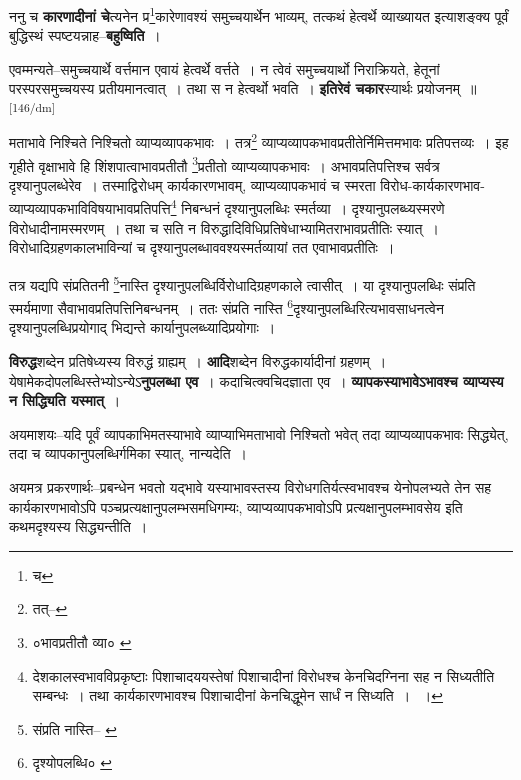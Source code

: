\documentclass[article,12pt,a4paper]{memoir}
\begin{document}
	  \pstart ननु च \textbf{कारणादीनां चे}त्यनेन प्र\footnote{च}कारेणावश्यं समुच्चयार्थेन भाव्यम्, तत्कथं हेत्वर्थे व्याख्यायत इत्याशङ्क्य पूर्वं बुद्धिस्थं स्पष्टयन्नाह--\textbf{बहुष्विति} ।
	\pend
      

	  \pstart एवम्मन्यते--समुच्चयार्थे वर्त्तमान एवायं हेत्वर्थे वर्त्तते । न त्वेवं समुच्चयार्थो निराक्रियते, हेतूनां परस्परसमुच्चयस्य प्रतीयमानत्वात् । तथा स न हेत्वर्थो भवति । \textbf{इतिरेवं चकार}स्यार्थः प्रयोजनम् ॥
	\pend
      \leavevmode\textsuperscript{\rmlatinfont\tiny [146/dm]}

	  \pstart मताभावे निश्चिते निश्चितो व्याप्यव्यापकभावः । तत्र\footnote{तत्--\cite{dp-msC}} व्याप्यव्यापकभावप्रतीतेर्निमित्तमभावः प्रतिपत्तव्यः । इह गृहीते वृक्षाभावे हि शिंशपात्वाभावप्रतीतौ \footnote{०भावप्रतीतौ व्या० \cite{dp-msB}}प्रतीतो व्याप्यव्यापकभावः । अभावप्रतिपत्तिश्च सर्वत्र दृश्यानुपलब्धेरेव । तस्माद्विरोधम् कार्यकारणभावम्, व्याप्यव्यापकभावं च स्मरता विरोध-कार्यकारणभाव-व्याप्यव्यापकभाविविषयाभावप्रतिपत्ति\footnote{देशकालस्वभावविप्रकृष्टाः पिशाचादययस्तेषां पिशाचादीनां विरोधश्च केनचिदग्निना सह न सिध्यतीति सम्बन्धः । तथा कार्यकारणभावश्च पिशाचादीनां केनचिद्धूमेन सार्धं न सिध्यति । \cite{dp-msD-n} ।} निबन्धनं दृश्यानुपलब्धिः स्मर्तव्या । दृश्यानुपलब्ध्यस्मरणे विरोधादीनामस्मरणम् । तथा च सति न विरुद्धादिविधिप्रतिषेधाभ्यामितराभावप्रतीतिः स्यात् । विरोधादिग्रहणकालभाविन्यां च दृश्यानुपलब्धाववश्यस्मर्तव्यायां तत एवाभावप्रतीतिः ।
	\pend
       

	  \pstart तत्र यद्यपि संप्रतितनी \footnote{संप्रति नास्ति--\cite{dp-msA} \cite{dp-edP} \cite{dp-edH} \cite{dp-edE} \cite{dp-edN}}नास्ति दृश्यानुपलब्धिर्विरोधादिग्रहणकाले त्वासीत् । या दृश्यानुपलब्धिः संप्रति स्मर्यमाणा सैवाभावप्रतिपत्तिनिबन्धनम् । ततः संप्रति नास्ति \footnote{दृश्योपलब्धि० \cite{dp-msA} \cite{dp-msB} \cite{dp-edP} \cite{dp-edH} \cite{dp-edE} \cite{dp-edN}}दृश्यानुपलब्धिरित्यभावसाधनत्वेन दृश्यानुपलब्धिप्रयोगाद् भिद्यन्ते कार्यानुपलब्ध्यादिप्रयोगाः ।
	\pend
      

	  \pstart \textbf{विरुद्ध}शब्देन प्रतिषेध्यस्य विरुद्धं ग्राह्यम् । \textbf{आदि}शब्देन विरुद्धकार्यादीनां ग्रहणम् । येषामेकदोपलब्धिस्तेभ्योऽन्येऽ\textbf{नुपलब्धा एव} । कदाचित्क्वचिदज्ञाता एव । \textbf{व्यापकस्याभावेऽभावश्च व्याप्यस्य न सिद्ध्यिति यस्मात्} ।
	\pend
      

	  \pstart अयमाशयः--यदि पूर्वं व्यापकाभिमतस्याभावे व्याप्याभिमताभावो निश्चितो भवेत् तदा व्याप्यव्यापकभावः सिद्ध्येत्, तदा च व्यापकानुपलब्धिर्गमिका स्यात्, नान्यदेति ।
	\pend
      

	  \pstart अयमत्र प्रकरणार्थः--प्रबन्धेन भवतो यद्भावे यस्याभावस्तस्य विरोधगतिर्यत्स्वभावश्च येनोपलभ्यते तेन सह कार्यकारणभावोऽपि पञ्चप्रत्यक्षानुपलम्भसमधिगम्यः, व्याप्यव्यापकभावोऽपि प्रत्यक्षानुपलम्भावसेय इति कथमदृश्यस्य सिद्ध्यन्तीति ।
	\pend
      
\end{document}
